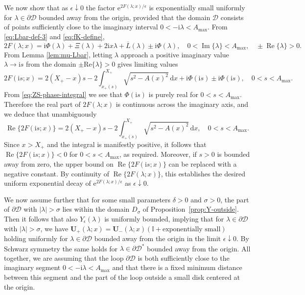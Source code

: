 \documentclass[12pt]{amsart}
\numberwithin{equation}{section}
\newcommand{\dd}{\mathrm{d}}
\newcommand{\ee}{\mathrm{e}}
\newcommand{\ii}{\mathrm{i}}
\newcommand{\SP}{\lambda}
\newcommand{\phaseint}{\Phi}
\newcommand{\tailint}{\Xi}
\newcommand{\eps}{\epsilon}
\DeclareMathOperator{\imag}{Im}
\DeclareMathOperator{\re}{Re}
\begin{document}
We now show that as $\epsilon\downarrow 0$ the factor $\ee^{2F(\lambda;x)/\eps}$ is exponentially small uniformly for $\lambda\in\partial\mathscr{D}$ bounded away from the origin, provided that the domain $\mathscr{D}$ consists of points sufficiently close to the imaginary interval $0<-\ii\lambda<A_\mathrm{max}$.  From 
\eqref{eq:Lbar-def-3} and \eqref{eq:fK-define},
\begin{equation}
2F(\lambda;x) = \ii\phaseint(\SP) + \tailint(\SP) + 2\ii x\lambda + \overline{L}(\SP) \pm \ii\phaseint(\SP), \quad 0<\imag\{\SP\}<A_\mathrm{max},
\quad\pm\re\{\SP\}>0.
\end{equation}
From Lemma \ref{lem:mu-Lbar}, letting $\lambda$ approach a positive imaginary value $\lambda\to \ii s$ from the domain $\pm\mathrm{Re}\{\lambda\}>0$ gives limiting values
\begin{equation}
2F(\ii s;x) = 2(X_+-x)s - 2\int_{x_+(s)}^{X_+}\sqrt{s^2-A(x)^2}\,\dd x
  +\ii\phaseint(\ii s) \pm \ii\phaseint(\ii s), \quad 0<s<A_\mathrm{max}.
\end{equation}
From \eqref{eq:ZS-phase-integral} we see that $\phaseint(\ii s)$ is purely 
real for $0<s<A_\mathrm{max}$.  Therefore the real part of $2F(\lambda;x)$ is continuous across the imaginary axis, and we deduce that unambiguously
\begin{equation}
\re\{2F(\ii s;x)\} = 2(X_+-x)s - 2\int_{x_+(s)}^{X_+}\sqrt{s^2-A(x)^2}\,\dd x
, \quad 0<s<A_\mathrm{max}.
\end{equation}
Since $x>X_+$ and the integral is manifestly positive, it follows that 
$\re\{2F(\ii s;x)\}<0$ for $0<s<A_\mathrm{max}$, as required.  Moreover, if $s>0$ is bounded away from zero, the upper bound on $\re\{2F(\ii s;x)\}$ can be replaced with a negative constant.  By continuity of $\re\{2F(\lambda;x)\}$, this establishes the desired uniform exponential decay of $\ee^{2F(\lambda;x)/\epsilon}$ as $\epsilon\downarrow 0$.

We now assume further that for some small parameters $\delta>0$ and $\sigma>0$, the part of $\partial\mathscr{D}$ with $|\lambda|>\sigma$ lies within the domain $D_\sigma$ of Proposition~\ref{prop:Y-outside}.  Then it follows that also $Y_\eps(\lambda)$ is uniformly bounded, implying that for $\lambda\in\partial\mathscr{D}$ with $|\lambda|>\sigma$, we have 
$\mathbf{U}_+(\SP;x)=\mathbf{U}_-(\SP;x)(\mathbb{I}+\text{exponentially small})$
holding uniformly for $\SP\in\partial\mathscr{D}$ bounded away from the origin in the limit $\epsilon\downarrow 0$.  
By Schwarz symmetry the same holds for $\SP\in\partial\mathscr{D}^*$ bounded 
away from the origin.  All together, we are assuming that the loop $\partial\mathscr{D}$ is both sufficiently close to the imaginary segment $0<-\ii\lambda<A_\mathrm{max}$ and that there is a fixed minimum distance between this segment and the part of the loop outside a small disk centered at the origin.
\end{document}
